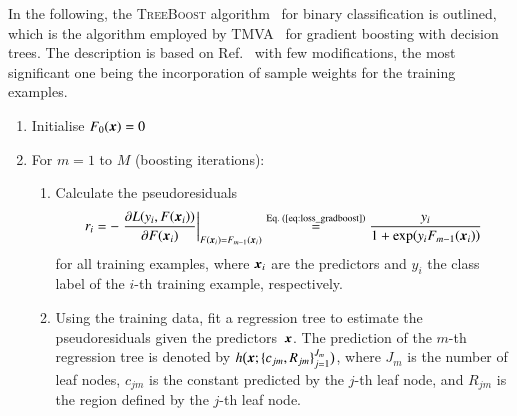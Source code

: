 In the following, the \textsc{TreeBoost} algorithm~\cite{Friedman:2001wbq} for
binary classification is outlined, which is the algorithm employed by
\textsc{TMVA}~\cite{TMVA} for gradient boosting with decision trees. The
description is based on Ref.~\cite{Friedman:2001wbq} with few modifications, the
most significant one being the incorporation of sample weights for the training
examples.
\begin{enumerate}
  \setlength{\itemsep}{4pt}

\item Initialise $F_0(\myvec{x}) = 0$

\item For $m = 1$ to $M$ (boosting iterations):
  \begin{enumerate}
    \setlength{\itemsep}{4pt}

  \item Calculate the pseudoresiduals
    \begin{align*}
      r_i
      = - \left. \frac{\partial L(y_i, F(\myvec{x}_i))}{\partial F(\myvec{x}_i)}\right|_{F(\myvec{x}_i) = F_{m - 1}(\myvec{x}_i)}
      \overset{\text{Eq.\ (\ref{eq:loss_gradboost})}}{=} \frac{y_i}{1 + \exp(y_i F_{m-1}(\myvec{x}_i))}
    \end{align*}
    for all training examples, where $\myvec{x}_i$ are the predictors and $y_i$
    the class label of the $i$-th training example, respectively.

  \item Using the training data, fit a regression tree to estimate the
    pseudoresiduals given the predictors~$\myvec{x}$. The prediction of the
    $m$-th regression tree is denoted by
    $h\bigl( \myvec{x}; \{c_{jm}, R_{jm}\}_{j=1}^{J_{m}} \bigr)$, where $J_{m}$
    is the number of leaf nodes, $c_{jm}$ is the constant predicted by the
    $j$-th leaf node, and $R_{jm}$ is the region defined by the $j$-th leaf
    node.


\end{enumerate}
\end{enumerate}
